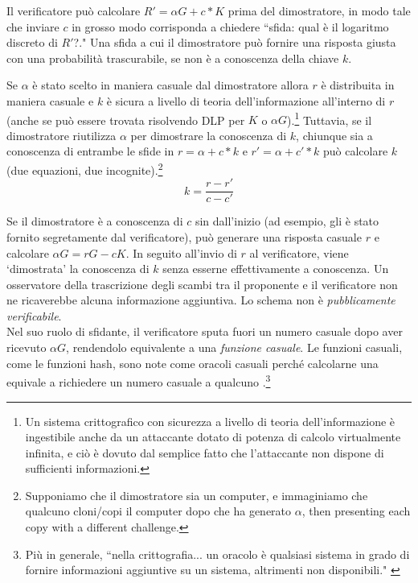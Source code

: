 Il verificatore può calcolare $R' = \alpha G + c*K$ prima del dimostratore, in modo tale che inviare $c$ in grosso modo corrisponda a chiedere ``sfida: qual è il logaritmo discreto di $R'$?." Una sfida a cui il dimostratore può fornire una risposta giusta con una probabilità trascurabile, se non è a conoscenza della chiave $k$.

Se $\alpha$ è stato scelto in maniera casuale dal dimostratore allora $r$ è distribuita in maniera casuale \cite{SCOZZAFAVA1993313} e $k$ è sicura a livello di teoria dell'informazione all'interno di $r$ (anche se può essere trovata risolvendo DLP per $K$ o $\alpha G$).\footnote{\label{information_theoretic_note}Un sistema crittografico con sicurezza a livello di teoria dell'informazione è ingestibile anche da un attaccante dotato di potenza di calcolo virtualmente infinita, e ciò è dovuto dal semplice fatto che l'attaccante non dispone di sufficienti informazioni.} Tuttavia, se il dimostratore riutilizza $\alpha$ per dimostrare la conoscenza di $k$, chiunque sia a conoscenza di entrambe le sfide in $r = \alpha + c*k$ e $r' = \alpha + c'*k$ può calcolare $k$ (due equazioni, due incognite).\footnote{Supponiamo che il dimostratore sia un computer, e immaginiamo che qualcuno cloni/copi il computer dopo che ha generato $\alpha$, then presenting each copy with a different challenge.}\vspace{.175cm}%
\[k = \frac{r-r'}{c-c'}\]

Se il dimostratore è a conoscenza di $c$ sin dall'inizio (ad esempio, gli è stato fornito segretamente dal verificatore), può generare una risposta casuale $r$ e calcolare $\alpha G = r G - c K$. In seguito all'invio di $r$ al verificatore, viene `dimostrata' la conoscenza di $k$ senza esserne effettivamente a conoscenza. Un osservatore della trascrizione degli scambi tra il proponente e il verificatore non ne ricaverebbe alcuna informazione aggiuntiva. Lo schema non è {\em pubblicamente verificabile}. \cite{Signatures2015BorromeanRS}\\

Nel suo ruolo di sfidante, il verificatore sputa fuori un numero casuale dopo aver ricevuto $\alpha G$, rendendolo equivalente a una {\em funzione casuale}. Le funzioni casuali, come le funzioni hash, sono note come oracoli casuali perché calcolarne una equivale a richiedere un numero casuale a qualcuno \cite{Signatures2015BorromeanRS}.\footnote{Più in generale, ``nella crittografia... un oracolo è qualsiasi sistema in grado di fornire informazioni aggiuntive su un sistema, altrimenti non disponibili." \cite{cryptographic-oracle}}\\

